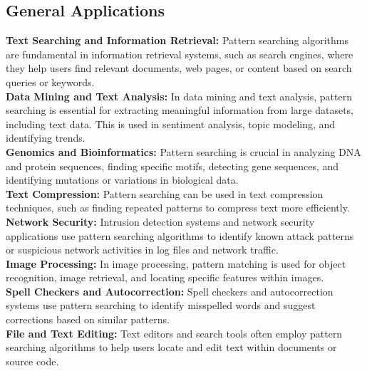 \documentclass[11pt,a4paper]{article}
\begin{document}
\subsection{General Applications}
\textbf{Text Searching and Information Retrieval:} Pattern searching algorithms are fundamental in information retrieval systems, such as search engines, where they help users find relevant documents, web pages, or content based on search queries or keywords.
\\
\textbf{Data Mining and Text Analysis:} In data mining and text analysis, pattern searching is essential for extracting meaningful information from large datasets, including text data. This is used in sentiment analysis, topic modeling, and identifying trends.
\\
\textbf{Genomics and Bioinformatics:} Pattern searching is crucial in analyzing DNA and protein sequences, finding specific motifs, detecting gene sequences, and identifying mutations or variations in biological data.
\\
\textbf{Text Compression:} Pattern searching can be used in text compression techniques, such as finding repeated patterns to compress text more efficiently.
\\
\textbf{Network Security:} Intrusion detection systems and network security applications use pattern searching algorithms to identify known attack patterns or suspicious network activities in log files and network traffic.
\\
\textbf{Image Processing:} In image processing, pattern matching is used for object recognition, image retrieval, and locating specific features within images.
\\
\textbf{Spell Checkers and Autocorrection: } Spell checkers and autocorrection systems use pattern searching to identify misspelled words and suggest corrections based on similar patterns.
\\
\textbf{File and Text Editing:} Text editors and search tools often employ pattern searching algorithms to help users locate and edit text within documents or source code.
\end{document}
